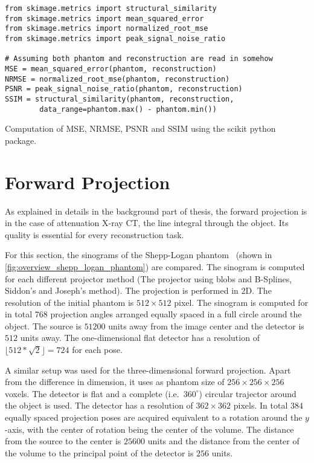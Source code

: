 \begin{listing}[h]
	\begin{verbatim}
from skimage.metrics import structural_similarity
from skimage.metrics import mean_squared_error
from skimage.metrics import normalized_root_mse
from skimage.metrics import peak_signal_noise_ratio

# Assuming both phantom and reconstruction are read in somehow
MSE = mean_squared_error(phantom, reconstruction)
NRMSE = normalized_root_mse(phantom, reconstruction)
PSNR = peak_signal_noise_ratio(phantom, reconstruction)
SSIM = structural_similarity(phantom, reconstruction,
        data_range=phantom.max() - phantom.min())
    \end{verbatim}
	\caption{Computation of \gls{MSE}, \gls{NRMSE}, \gls{PSNR} and \gls{SSIM} using the scikit
		python package.}\label{py:error_metric}
\end{listing}

\section{Forward Projection}\label{sec:experiments_forward_projection}

As explained in details in the background part of thesis, the forward projection is in the case of
attenuation X-ray CT, the line integral through the object. Its quality is essential for every
reconstruction task.

For this section, the sinograms of the Shepp-Logan phantom~\cite{shepp_fourier_1974} (shown in
\autoref{fig:overview_shepp_logan_phantom}) are compared. The sinogram is computed for each
different projector method (The projector using blobs and B-Splines, Siddon's and Joseph's method).
The projection is performed in \(2\)D. The resolution of the initial phantom is \(512 \times 512\)
pixel. The sinogram is computed for in total \(768\) projection angles arranged equally spaced in a
full circle around the object. The source is \(51200\) units away from the image center and the
detector is \(512\) units away. The one-dimensional flat detector has a resolution of \(\lfloor 512
* \sqrt{2} \rfloor = 724\) for each pose.

A similar setup was used for the three-dimensional forward projection. Apart from the difference in
dimension, it uses as phantom size of \(256 \times 256 \times 256\) voxels. The detector is flat and
a complete (i.e.\ \(360^\circ\)) circular trajector around the object is used. The detector has a
resolution of \(362 \times 362\) pixels. In total \(384\) equally spaced projection poses are
acquired equivalent to a rotation around the \(y\)-axis, with the center of rotation being the
center of the volume. The distance from the source to the center is \(25600\) units and the
distance from the center of the volume to the principal point of the detector is \(256\) units.

